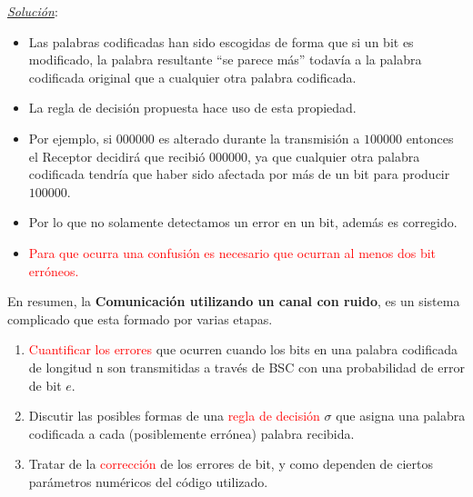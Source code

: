 \documentclass{beamer}
\theoremstyle{plain}
\theoremstyle{example}
\theoremstyle{example}
\begin{document}
\begin{frame}  \footnotesize


\textit{\underline{Solución}}:\\
\vspace{0.3cm}
\begin{itemize} 
\item Las palabras codificadas han sido escogidas de forma que si un bit es modificado, la palabra resultante  ``se parece más''  todavía a la palabra codificada original que a cualquier otra palabra codificada.

\item La regla de decisión propuesta hace uso de esta propiedad. 

\item Por ejemplo, si $000000$ es alterado durante la transmisión a $100000$ entonces el Receptor decidirá que recibió $000000$, ya que cualquier otra palabra codificada tendría que haber sido afectada por más de un bit para producir 
$100000$. 

\item Por lo que no solamente detectamos un error en un bit, además es corregido. 

\item \textcolor{red}{Para que ocurra una confusión es necesario que ocurran al menos dos bit erróneos.}
\end{itemize}

\end{frame} 

\begin{frame}  \small 

En resumen, la\textbf{ Comunicación utilizando un canal con ruido},  es un sistema complicado que esta formado por varias etapas.

\begin{enumerate}
\item  \textcolor{red}{Cuantificar los errores} que ocurren cuando los bits en una palabra codificada de longitud n son transmitidas a través de BSC con una probabilidad de error de bit $e$.

\item  Discutir las posibles formas de una \textcolor{red}{regla de decisión}  $\sigma$ que asigna una palabra codificada a cada (posiblemente errónea) palabra recibida.

\item  Tratar de la \textcolor{red}{corrección} de los errores de bit, y como dependen de ciertos parámetros numéricos del código utilizado.
\end{enumerate}

\end{frame} 
\end{document}
